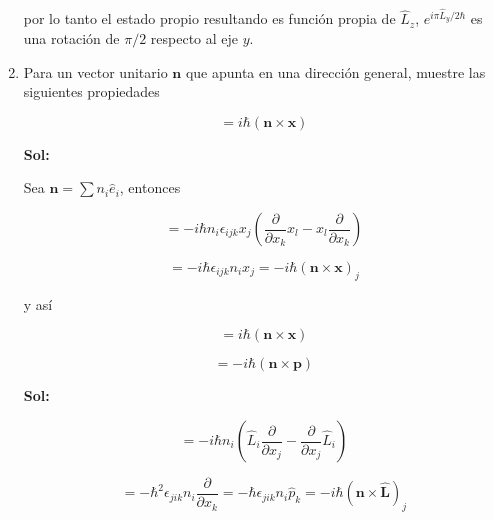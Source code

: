 \documentclass[12pt,a4paper]{article}
\begin{document}
\begin{enumerate}
por lo tanto el estado propio resultando es función propia de $\hat{L}_{z}$, $e^{i\pi \hat{L}_{y}/2 \hbar}$ es una rotación de $\pi/2$ respecto al eje $y$.




\item Para un vector unitario $\mathbf{n}$ que apunta en una dirección general, muestre las siguientes propiedades

\begin{equation*}
    [\mathbf{n} \cdot \mathbf{\hat{L}} , \mathbf{x}] = i \hbar (\mathbf{n} \times \mathbf{x})
\end{equation*}

\textbf{Sol:}

Sea $\mathbf{n} = \sum n_i \hat{e}_{i}$, entonces

\begin{equation*}
    [n_i \hat{L}_i,\hat{p}_{j}] = - i \hbar n_i \epsilon_{ijk} x_j \left(\frac{\partial}{\partial x_k} x_l - x_l \frac{\partial}{\partial x_k}\right)
\end{equation*}



\begin{equation*}
    = - i \hbar \epsilon_{ijk} n_i x_j = - i \hbar (\mathbf{n} \times \mathbf{x})_j
\end{equation*}

y así

\begin{equation*}
    [\mathbf{n} \cdot \mathbf{\hat{L}} , \mathbf{x}] = i \hbar (\mathbf{n} \times \mathbf{x})
\end{equation*}

\begin{equation*}
    [\mathbf{n} \cdot \mathbf{L}, \mathbf{p}] = - i \hbar (\mathbf{n} \times \mathbf{p})
\end{equation*}

\textbf{Sol:}

\begin{equation*}
    [n_i \hat{L}_i, \hat{p_j}] = - i \hbar n_i \left(\hat{L}_i \frac{\partial}{\partial x_j} - \frac{\partial}{\partial x_j} \hat{L}_i \right)
\end{equation*}

\begin{equation*}
    = - \hbar^2 \epsilon_{jik} n_i \frac{\partial}{\partial x_k} = - \hbar \epsilon_{jik} n_i \hat{p}_{k} = - i \hbar (\mathbf{n} \times \mathbf{\hat{L}})_j
\end{equation*}


\end{enumerate}
\end{document}
